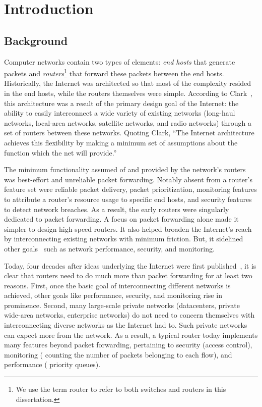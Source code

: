 \chapter{Introduction}
\label{chap:intro}

\section{Background}
\label{s:intro_background}
Computer networks contain two types of elements: {\em end hosts} that generate
packets and {\em routers}\footnote{We use the term router to refer to both
switches and routers in this dissertation.} that forward these packets between
the end hosts. Historically, the Internet was architected so that most of the
complexity resided in the end hosts, while the routers themselves were simple.
According to Clark~\cite{design_philosophy}, this architecture was a result of
the primary design goal of the Internet: the ability to easily interconnect a
wide variety of existing networks (\eg long-haul networks, local-area networks,
satellite networks, and radio networks) through a set of routers
 between these networks. Quoting Clark, ``The Internet
architecture achieves this flexibility by making a minimum set of assumptions
about the function which the net will provide.''

The minimum functionality assumed of and provided by the network's routers was
best-effort and unreliable packet forwarding. Notably absent from a router's
feature set were reliable packet delivery, packet prioritization, monitoring
features to attribute a router's resource usage to specific end hosts, and
security features to detect network breaches. As a result, the early routers
were singularly dedicated to packet forwarding. A focus on packet forwarding
alone made it simpler to design high-speed routers. It also helped broaden the
Internet's reach by interconnecting existing networks with minimum friction.
But, it sidelined other goals~\cite{design_philosophy} such as network
performance, security, and monitoring.
 
Today, four decades after ideas underlying the Internet were first
published~\cite{cerf74}, it is clear that routers need to do much more than
packet forwarding for at least two reasons. First, once the basic goal of
interconnecting different networks is achieved, other goals like performance,
security, and monitoring rise in prominence.  Second, many large-scale private
networks (\eg datacenters, private wide-area networks, enterprise networks) do
not need to concern themselves with interconnecting diverse networks as the
Internet had to. Such private networks can expect more from the network. As a
result, a typical router today implements many features beyond packet
forwarding, pertaining to security (\eg access control), monitoring (\eg
counting the number of packets belonging to each flow), and performance (\eg
priority queues).

